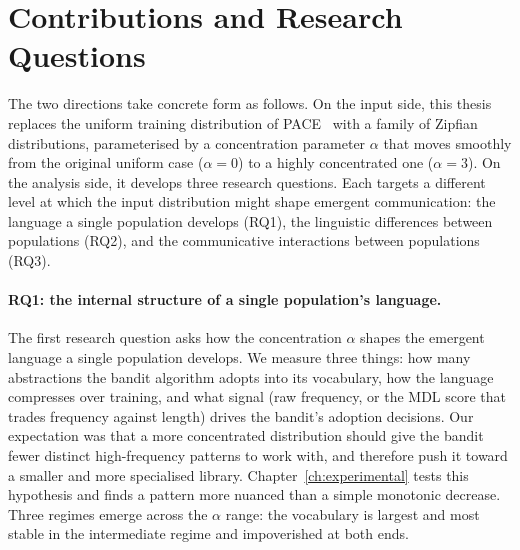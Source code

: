 \section{Contributions and Research Questions}
\label{sec:intro-contributions}

The two directions take concrete form as follows. On the input side, this thesis replaces the uniform training distribution of PACE~\cite{thomas_pace_2025} with a family of Zipfian distributions, parameterised by a concentration parameter $\alpha$ that moves smoothly from the original uniform case ($\alpha = 0$) to a highly concentrated one ($\alpha = 3$). On the analysis side, it develops three research questions. Each targets a different level at which the input distribution might shape emergent communication: the language a single population develops (RQ1), the linguistic differences between populations (RQ2), and the communicative interactions between populations (RQ3).

\paragraph{RQ1: the internal structure of a single population's language.}
The first research question asks how the concentration $\alpha$ shapes the emergent language a single population develops. We measure three things: how many abstractions the bandit algorithm adopts into its vocabulary, how the language compresses over training, and what signal (raw frequency, or the MDL score that trades frequency against length) drives the bandit's adoption decisions. Our expectation was that a more concentrated distribution should give the bandit fewer distinct high-frequency patterns to work with, and therefore push it toward a smaller and more specialised library. Chapter~\ref{ch:experimental} tests this hypothesis and finds a pattern more nuanced than a simple monotonic decrease. Three regimes emerge across the $\alpha$ range: the vocabulary is largest and most stable in the intermediate regime and impoverished at both ends.

